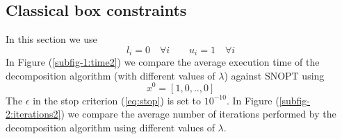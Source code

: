 \subsection{Classical box constraints}
In this section we use 
\begin{equation}\label{eq:classicalbox}
l_i = 0 \quad \forall i \qquad u_i = 1  \quad \forall i
\end{equation} 
In Figure (\ref{subfig-1:time2}) we compare the average execution time of the decomposition algorithm (with different values of $\lambda$) against SNOPT using 
\begin{equation}
x^0 = \left[1, 0, .., 0 \right]
\end{equation}
The $\epsilon$ in the stop criterion (\ref{eq:stop}) is set to $10^{-10}$. In Figure (\ref{subfig-2:iterations2}) we compare the average number of iterations performed by the decomposition algorithm using different values of $\lambda$.
